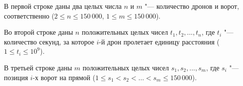 В первой строке даны два целых числа $n$ и $m$ "--- количество дронов и ворот, соответственно ($2 \le n \le 150\,000$, $1 \le m \le 150\,000$).

Во второй строке даны $n$ положительных целых чисел $t_1, t_2,...,t_n$, где $t_i$ "--- количество секунд, за которое $i$-й дрон пролетает единицу расстояния ($1 \le t_i \le 10^9$).

В третьей строке даны $m$ положительных целых чисел $s_1, s_2,...,s_m$, где $s_i$ "--- позиция $i$-х ворот на прямой ($1 \le s_1 < s_2 < \ldots < s_m \le 150\,000$).
